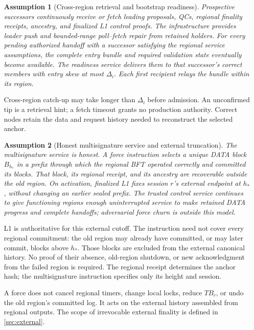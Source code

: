 \documentclass[11pt,a4paper]{article}
\newtheorem{assumption}[assumption]{Assumption}
\begin{document}
\begin{assumption}[Cross-region retrieval and bootstrap readiness]
\label{ass:infra}
Prospective successors continuously receive or fetch leading proposals,
QCs, regional finality receipts, ancestry, and finalized L1 control proofs.
The infrastructure provides leader push and bounded-range poll--fetch
repair from retained holders. For every pending authorized handoff with
a successor satisfying the regional service assumptions, the complete
entry bundle and required validation state eventually become available.
The readiness service delivers them to that successor's correct members
with entry skew at most $\Delta_i$. Each first recipient relays the bundle
within its region.
\end{assumption}
Cross-region catch-up may take longer than $\Delta_i$ before admission.
An unconfirmed tip is a retrieval hint; a fetch timeout grants no
production authority. Correct nodes retain the data and request history
needed to reconstruct the selected anchor.

\begin{assumption}[Honest multisignature service and external truncation]
\label{ass:cut}
The multisignature service is honest. A force instruction selects a
unique DATA block $B_{h_*}$ in a prefix through which the regional BFT
operated correctly and committed its blocks. That block, its regional
receipt, and its ancestry are recoverable outside the old region.
On activation, finalized L1 fixes session $r$'s external endpoint at
$h_*$, without changing an earlier sealed prefix. The trusted control
service continues to give functioning regions enough uninterrupted
service to make retained DATA progress and complete handoffs; adversarial force churn
is outside this model.
\end{assumption}
L1 is authoritative for this external cutoff. The instruction need not
cover every regional commitment: the old region may already have committed,
or may later commit, blocks above $h_*$. Those blocks are excluded from
the external canonical history. No proof of their absence, old-region
shutdown, or new acknowledgment from the failed region is required.
The regional receipt determines the anchor hash; the multisignature
instruction specifies only its height and session.

A force does not cancel regional timers, change local locks, reduce
$TB_r$, or undo the old region's committed log. It acts on the external
history assembled from regional outputs. The scope of irrevocable
external finality is defined in \cref{sec:external}.
\end{document}
